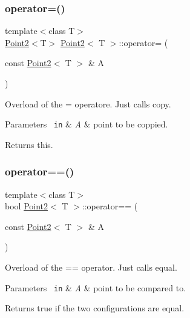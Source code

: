 \subsubsection{\texorpdfstring{operator=()}{operator=()}}
{\footnotesize\ttfamily template$<$class T$>$ \\
\mbox{\hyperlink{class_point2}{Point2}}$<$T$>$ \mbox{\hyperlink{class_point2}{Point2}}$<$ T $>$\+::operator= (\begin{DoxyParamCaption}\item[{const \mbox{\hyperlink{class_point2}{Point2}}$<$ T $>$ \&}]{A }\end{DoxyParamCaption})\hspace{0.3cm}{\ttfamily [inline]}}



Overload of the = operatore. Just calls {\ttfamily copy}. 


\begin{DoxyParams}[1]{Parameters}
\mbox{\texttt{ in}}  & {\em A} & point to be coppied. \\
\hline
\end{DoxyParams}
\begin{DoxyReturn}{Returns}
this. 
\end{DoxyReturn}
\mbox{\label{class_point2_af58b2b05b59316580b3989b0548afade}} 
\subsubsection{\texorpdfstring{operator==()}{operator==()}}
{\footnotesize\ttfamily template$<$class T$>$ \\
bool \mbox{\hyperlink{class_point2}{Point2}}$<$ T $>$\+::operator== (\begin{DoxyParamCaption}\item[{const \mbox{\hyperlink{class_point2}{Point2}}$<$ T $>$ \&}]{A }\end{DoxyParamCaption})\hspace{0.3cm}{\ttfamily [inline]}}



Overload of the == operator. Just calls {\ttfamily equal}. 


\begin{DoxyParams}[1]{Parameters}
\mbox{\texttt{ in}}  & {\em A} & point to be compared to. \\
\hline
\end{DoxyParams}
\begin{DoxyReturn}{Returns}
true if the two configurations are equal. 
\end{DoxyReturn}
\mbox{\label{class_point2_afe4e1b27eb2a47f6f98695d0b715a044}} 

